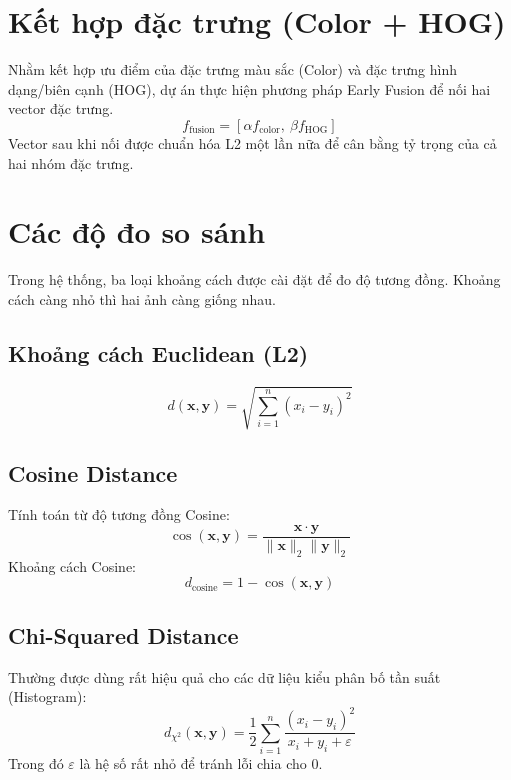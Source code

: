 \section{Kết hợp đặc trưng (Color + HOG)}
Nhằm kết hợp ưu điểm của đặc trưng màu sắc (Color) và đặc trưng hình dạng/biên cạnh (HOG), dự án thực hiện phương pháp Early Fusion để nối hai vector đặc trưng.
\begin{equation}
f_{\text{fusion}} = [\alpha f_{\text{color}},\ \beta f_{\text{HOG}}]
\end{equation}
Vector sau khi nối được chuẩn hóa L2 một lần nữa để cân bằng tỷ trọng của cả hai nhóm đặc trưng.

\section{Các độ đo so sánh}
Trong hệ thống, ba loại khoảng cách được cài đặt để đo độ tương đồng. Khoảng cách càng nhỏ thì hai ảnh càng giống nhau.

\subsection{Khoảng cách Euclidean (L2)}
\begin{equation}
d(\mathbf{x},\mathbf{y}) = \sqrt{\sum_{i=1}^{n} (x_i - y_i)^2}
\end{equation}

\subsection{Cosine Distance}
Tính toán từ độ tương đồng Cosine:
\begin{equation}
\operatorname{cos}(\mathbf{x},\mathbf{y}) = \frac{\mathbf{x} \cdot \mathbf{y}}{\|\mathbf{x}\|_2 \|\mathbf{y}\|_2}
\end{equation}
Khoảng cách Cosine:
\begin{equation}
d_{\text{cosine}} = 1 - \operatorname{cos}(\mathbf{x},\mathbf{y})
\end{equation}

\subsection{Chi-Squared Distance}
Thường được dùng rất hiệu quả cho các dữ liệu kiểu phân bố tần suất (Histogram):
\begin{equation}
d_{\chi^2}(\mathbf{x},\mathbf{y}) = \frac{1}{2} \sum_{i=1}^{n} \frac{(x_i - y_i)^2}{x_i + y_i + \varepsilon}
\end{equation}
Trong đó $\varepsilon$ là hệ số rất nhỏ để tránh lỗi chia cho 0.

